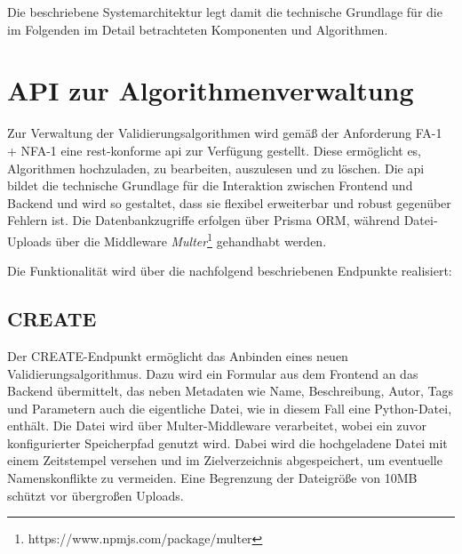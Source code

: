 Die beschriebene Systemarchitektur legt damit die technische Grundlage für die im Folgenden im Detail betrachteten Komponenten und Algorithmen.



\section{API zur Algorithmenverwaltung}
\label{sec:konzept_api}

Zur Verwaltung der Validierungsalgorithmen wird gemäß der Anforderung FA-1 + NFA-1 eine \gls{rest}-konforme \gls{api} zur Verfügung gestellt. Diese ermöglicht es, Algorithmen hochzuladen, zu bearbeiten, auszulesen und zu löschen. Die \gls{api} bildet die technische Grundlage für die Interaktion zwischen Frontend und Backend und wird so gestaltet, dass sie flexibel erweiterbar und robust gegenüber Fehlern ist. Die Datenbankzugriffe erfolgen über Prisma ORM, während Datei-Uploads über die Middleware \textit{Multer}\footnote{https://www.npmjs.com/package/multer} gehandhabt werden.

Die Funktionalität wird über die nachfolgend beschriebenen Endpunkte realisiert:

\subsection{CREATE}
\label{subsec:api_create}
Der CREATE-Endpunkt ermöglicht das Anbinden eines neuen Validierungsalgorithmus. Dazu wird ein Formular aus dem Frontend an das Backend übermittelt, das neben Metadaten wie Name, Beschreibung, Autor, Tags und Parametern auch die eigentliche Datei, wie in diesem Fall eine Python-Datei, enthält. Die Datei wird über Multer-Middleware verarbeitet, wobei ein zuvor konfigurierter Speicherpfad genutzt wird. Dabei wird die hochgeladene Datei mit einem Zeitstempel versehen und im Zielverzeichnis abgespeichert, um eventuelle Namenskonflikte zu vermeiden. Eine Begrenzung der Dateigröße von 10MB schützt vor übergroßen Uploads.

